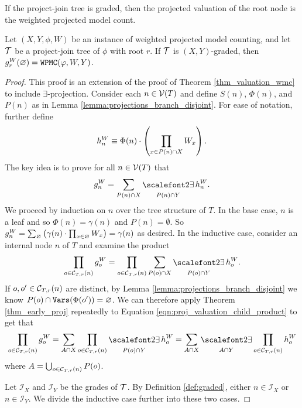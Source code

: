 If the project-join tree is graded, then the projected valuation of the root node is the weighted projected model count.
\begin{theorem}
\label{thm:proj_valuation}
Let $(X, Y, \phi, W)$ be an instance of weighted projected model counting, and let $\mathcal{T}$ be a project-join tree of $\phi$ with root $r$. 
If $\mathcal{T}$ is $(X, Y)$-graded, then $g^W_r(\varnothing) = \texttt{\upshape WPMC}(\varphi, W, Y)$.
\end{theorem}
\begin{proof}
This proof is an extension of the proof of Theorem \ref{thm_valuation_wmc} to include $\exists$-projection. 
Consider each $n \in \mathcal{V}(T)$ and define $S(n)$, $\Phi(n)$, and $P(n)$ as in Lemma \ref{lemma:projections_branch_disjoint}. For ease of notation, further define 
$$h^W_n \equiv \Phi(n) \cdot \left( \prod_{x \in P(n) \cap X} W_x \right).$$
The key idea is to prove for all $n \in \mathcal{V}(T)$ that 
$$g^W_n = \sum_{P(n) \cap X} \displaystyle\exist_{P(n) \cap Y} h^W_n \label{eqn:proj-valuation:correctness}.$$
We proceed by induction on $n$ over the tree structure of $T$. In the base case, $n$ is a leaf and so $\Phi(n) = \gamma(n)$ and $P(n) = \emptyset$. So $g^W_n = \sum_{\varnothing} \left(  \gamma(n) \cdot \prod_{x \in \varnothing} W_x  \right) = \gamma(n)$ as desired. In the inductive case, consider an internal node $n$ of $T$ and examine the product
\begin{equation}
\label{eqn:proj_valuation_child_product}
    \prod_{o \in \C T r n} g^W_o = \prod_{o \in \C T r n} \sum_{P(o) \cap X} \displaystyle\exist_{P(o) \cap Y} h^W_o.
\end{equation}
If $o, o' \in \mathcal{C}_{T,r}(n)$ are distinct, by Lemma \ref{lemma:projections_branch_disjoint} we know $P(o) \cap \texttt{\upshape Vars}(\Phi(o')) = \varnothing$. We can therefore apply Theorem \ref{thm_early_proj} repeatedly to Equation \ref{eqn:proj_valuation_child_product} to get that
\begin{equation}
\prod_{o \in \C{T}{r}{n}} g^W_o = \sum_{A \cap X} \prod_{o \in \C{T}{r}{n}} \displaystyle\exist_{P(o) \cap Y} h^W_o = \sum_{A \cap X} \displaystyle\exist_{A \cap Y} \prod_{o \in \C{T}{r}{n}} h^W_o \label{eq_child_prod}
\end{equation}
where $A = \bigcup_{o \in \mathcal{C}_{T,r}(n)} P(o)$.

Let $\mathcal{I}_X$ and $\mathcal{I}_Y$ be the grades of $\mathcal{T}$. By Definition \ref{def:graded}, either $n \in \mathcal{I}_X$ or $n \in \mathcal{I}_Y$. We divide the inductive case further into these two cases.


\end{proof}
